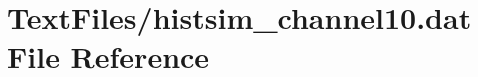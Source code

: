 \hypertarget{TextFiles_2histsim__channel10_8dat}{}\section{Text\+Files/histsim\+\_\+channel10.dat File Reference}
\label{TextFiles_2histsim__channel10_8dat}
